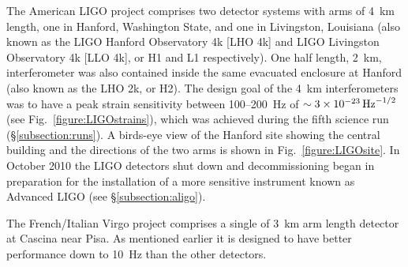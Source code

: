 \documentclass{article}
\begin{document}
The American LIGO project \cite{LIGOweb} comprises two detector
systems with arms of 4~km length, one in Hanford, Washington State, and one in
Livingston, Louisiana (also known as the LIGO Hanford Observatory 4k [LHO 4k] 
and LIGO Livingston Observatory 4k [LLO 4k], or H1 and L1
respectively). One half length, 2~km, interferometer was also contained inside
the same evacuated enclosure at Hanford (also known as the LHO 2k, or H2). The
design goal of the 4~km interferometers was to have a peak strain sensitivity
between 100--200~Hz of $\sim 3\times10^{-23}\,{\rm Hz}^{-1/2}$ \cite{LIGOSRD}
(see Fig.~\ref{figure:LIGOstrains}), which was achieved during the fifth 
science run (\S\ref{subsection:runs}). A birds-eye view of the Hanford site
showing the central building and the directions of the two arms is shown in
Fig.~\ref{figure:LIGOsite}. In October 2010 the LIGO detectors shut down and
decommissioning began in preparation for the installation of a more sensitive 
instrument known as Advanced LIGO (see \S\ref{subsection:aligo}).


The French/Italian Virgo project \cite{Virgoweb} comprises a single of 3~km arm
length detector at Cascina near Pisa. As mentioned earlier it is designed to
have better performance down to 10~Hz than the other detectors.
\end{document}
